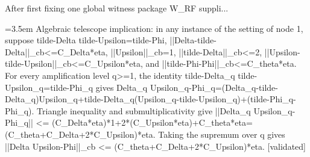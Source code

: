 \documentclass{article}
\newcommand{\step}[1]{\par\noindent\hangindent=3.5em\hangafter=1%
  \makebox[3.5em][l]{\textbf{#1.}}}
\newcommand{\steptag}[1]{\hfill{\small\textsf{[#1]}}}
\begin{document}
\begin{proofbox}{After first fixing one global witness package W\_RF suppli...}
\step{1.3} Algebraic telescope implication: in any instance of the setting of node 1, suppose tilde-Delta tilde-Upsilon=tilde-Phi, ||Delta-tilde-Delta||\_cb<=C\_Delta*eta, ||Upsilon||\_cb=1, ||tilde-Delta||\_cb<=2, ||Upsilon-tilde-Upsilon||\_cb<=C\_Upsilon*eta, and ||tilde-Phi-Phi||\_cb<=C\_theta*eta.  For every amplification level q>=1, the identity tilde-Delta\_q tilde-Upsilon\_q=tilde-Phi\_q gives Delta\_q Upsilon\_q-Phi\_q=(Delta\_q-tilde-Delta\_q)Upsilon\_q+tilde-Delta\_q(Upsilon\_q-tilde-Upsilon\_q)+(tilde-Phi\_q-Phi\_q).  Triangle inequality and submultiplicativity give ||Delta\_q Upsilon\_q-Phi\_q|| <= (C\_Delta*eta)*1+2*(C\_Upsilon*eta)+C\_theta*eta=(C\_theta+C\_Delta+2*C\_Upsilon)*eta.  Taking the supremum over q gives ||Delta Upsilon-Phi||\_cb <= (C\_theta+C\_Delta+2*C\_Upsilon)*eta. \steptag{validated} \\[4pt]
\end{proofbox}
\end{document}
